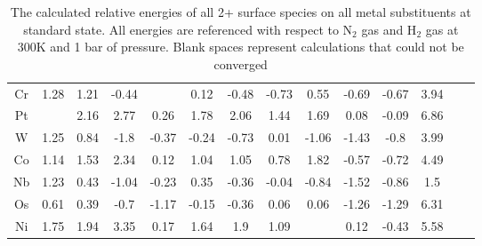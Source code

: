 \begin{table}
\begin{center}
\begin{tabular}{| c | c | c | c | c | c | c | c | c | c | c | c | c | c |}
Cr & 1.28 & 1.21 & -0.44 &  & 0.12 & -0.48 & -0.73 & 0.55 & -0.69 & -0.67 & 3.94 \\
Pt &  & 2.16 & 2.77 & 0.26 & 1.78 & 2.06 & 1.44 & 1.69 & 0.08 & -0.09 & 6.86 \\
W & 1.25 & 0.84 & -1.8 & -0.37 & -0.24 & -0.73 & 0.01 & -1.06 & -1.43 & -0.8 & 3.99 \\
Co & 1.14 & 1.53 & 2.34 & 0.12 & 1.04 & 1.05 & 0.78 & 1.82 & -0.57 & -0.72 & 4.49 \\
Nb & 1.23 & 0.43 & -1.04 & -0.23 & 0.35 & -0.36 & -0.04 & -0.84 & -1.52 & -0.86 & 1.5 \\
Os & 0.61 & 0.39 & -0.7 & -1.17 & -0.15 & -0.36 & 0.06 & 0.06 & -1.26 & -1.29 & 6.31 \\
Ni & 1.75 & 1.94 & 3.35 & 0.17 & 1.64 & 1.9 & 1.09 &  & 0.12 & -0.43 & 5.58 \\
\hline
\end{tabular}
\end{center}
\caption{The calculated relative energies of all 2+ surface species on all metal substituents at standard state. All energies are referenced with respect to N$_2$ gas and H$_2$ gas at 300K and 1 bar of pressure. Blank spaces represent calculations that could not be converged}
\label{table:energies}
\end{table}

